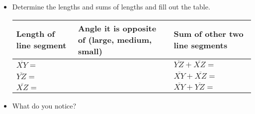 \documentclass[12pt,letterpaper]{article}
\begin{document}
\begin{enumerate}
          \begin{itemize}
              \item Determine the lengths and sums of lengths and fill out the table. \\
                    \begin{tabularx}{0.9\textwidth} {
                            | >{\flushleft\arraybackslash}X
                            | >{\flushleft\arraybackslash}X
                            | >{\flushleft\arraybackslash}X |}
                        \hline
                        Length of line segment \vspace{2mm}        & Angle it is opposite of (large, medium, small) & Sum of other two line segments                 \\
                        \hline
                        \vspace{1mm} $\overline{XY}=$ \vspace{1mm} &                                                & \vspace{1mm} $\overline{YZ} + \overline{XZ}= $ \\
                        \hline
                        \vspace{1mm}$\overline{YZ}=$ \vspace{2mm}  &                                                & \vspace{1mm} $\overline{XY} + \overline{XZ}= $ \\
                        \hline
                        \vspace{1mm}$\overline{XZ}=$ \vspace{2mm}  &                                                & \vspace{1mm} $\overline{XY} + \overline{YZ}= $ \\
                        \hline
                    \end{tabularx}
              \item What do you notice?
          \end{itemize}


\end{enumerate}
\end{document}
